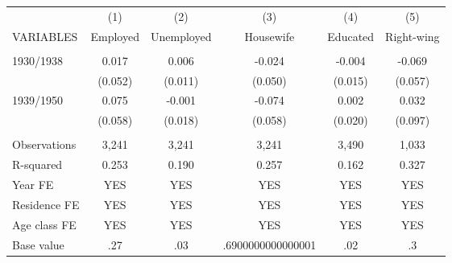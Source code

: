 \begin{tabular}{lccccc} \hline
 & (1) & (2) & (3) & (4) & (5) \\
VARIABLES & Employed & Unemployed & Housewife & Educated & Right-wing \\ \hline
 &  &  &  &  &  \\
1930/1938 & 0.017 & 0.006 & -0.024 & -0.004 & -0.069 \\
 & (0.052) & (0.011) & (0.050) & (0.015) & (0.057) \\
1939/1950 & 0.075 & -0.001 & -0.074 & 0.002 & 0.032 \\
 & (0.058) & (0.018) & (0.058) & (0.020) & (0.097) \\
 &  &  &  &  &  \\
Observations & 3,241 & 3,241 & 3,241 & 3,490 & 1,033 \\
R-squared & 0.253 & 0.190 & 0.257 & 0.162 & 0.327 \\
Year FE & YES & YES & YES & YES & YES \\
Residence FE & YES & YES & YES & YES & YES \\
Age class FE & YES & YES & YES & YES & YES \\
 Base value & .27 & .03 & .6900000000000001 & .02 & .3 \\ \hline
\end{tabular}
